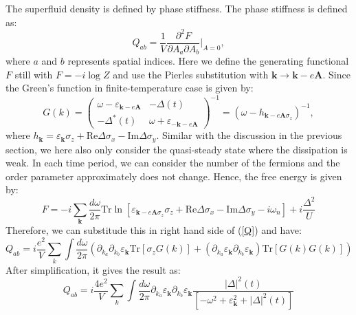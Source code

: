\documentclass[aps,onecolumn,superscriptaddress,notitlepage,longbibliography]{revtex4-1}
\begin{document}
The superfluid density is defined by phase stiffness. The phase stiffness is
defined as:
\begin{equation}
  Q_{a b} = \frac{1}{V} \frac{\partial^2 F}{\partial A_a \partial A_b} |_{A =
  0} , \label{Q}
\end{equation}
where $a$ and $b$ represents spatial indices. Here we define the generating functional $F$ still with $F=-i\log Z$ and use the Pierles
substitution with $\mathbf{k} \rightarrow \mathbf{k}- e\mathbf{A}$.
Since the Green's function in finite-temperature case is given by:
\begin{equation}
  G (k) = \left(\begin{array}{cc}
    \omega - \varepsilon_{\mathbf{k}- e\mathbf{A}} & - \Delta (t)\\
    - \Delta^{\ast} (t) & \omega + \varepsilon_{-\mathbf{k}-
    e\mathbf{A}}
  \end{array}\right)^{- 1} = (\omega - h_{\mathbf{k}- e\mathbf{A}
  \sigma_z})^{- 1},
\end{equation}
where $h_{\mathbf{k}} = \varepsilon_{\mathbf{k}}
\sigma_z + \text{Re} \Delta \sigma_x - \text{Im} \Delta \sigma_y$. Similar with the discussion in the previous section, we here also only consider the quasi-steady state where the dissipation is weak. In each time period, we can consider the number of the fermions and the order parameter approximately does not change. Hence, the free energy is given by:
\begin{equation}
  F = - i \sum_{\mathbf{k}}\frac{d\omega}{2\pi} \text{Tr} \ln
  [\varepsilon_{\mathbf{k}- e\mathbf{A} \sigma_z} \sigma_z + \text{Re}
  \Delta \sigma_x - \text{Im} \Delta \sigma_y - i \omega_n] +i\frac{\Delta^2}{U}
\end{equation}
Therefore, we can substitude this in right hand side of (\ref{Q}) and have:
\begin{equation}
  Q_{a b} = i\frac{e^2}{V} \sum_k\int\frac{d\omega}{2\pi} (\partial_{k_a} \partial_{k_b}
  \varepsilon_{\mathbf{k}} \text{Tr} [\sigma_z G (k)] + (\partial_{k_a}
  \varepsilon_{\mathbf{k}} \partial_{k_b} \varepsilon_{\mathbf{k}})
  \text{Tr} [G (k) G (k)])
\end{equation}
After simplification, it gives the result as:
\begin{equation}
  Q_{a b} = i\frac{4 e^2}{V} \sum_k\int\frac{d\omega}{2\pi} \partial_{k_a}
  \varepsilon_{\mathbf{k}} \partial_{k_b} \varepsilon_{\mathbf{k}} \frac{|
  \Delta |^2 (t)}{[-\omega^2 + \varepsilon_{\mathbf{k}}^2 + | \Delta |^2
  (t)]}
\end{equation}
\end{document}
